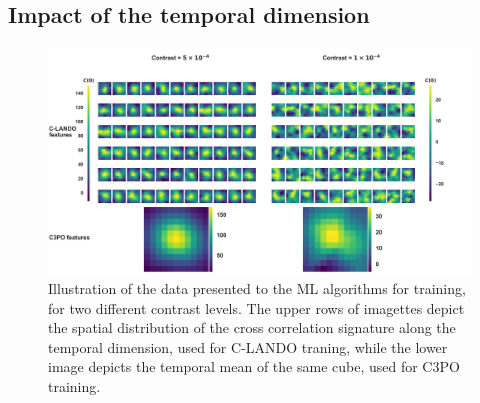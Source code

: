 \documentclass{aa}
\begin{document}
\subsection{Impact of the temporal dimension}

\begin{figure}
\centering
\includegraphics[width=\textwidth]{fig5_disc_dec2023_cropped.png}
\caption{Illustration of the data presented to the ML algorithms for training, for two different contrast levels. The upper rows of imagettes depict the spatial distribution of the cross correlation signature along the temporal dimension, used for C-LANDO traning, while the lower image depicts the temporal mean of the same cube, used for C3PO training. }
\label{fig:disc-part1}
\end{figure}
\end{document}
